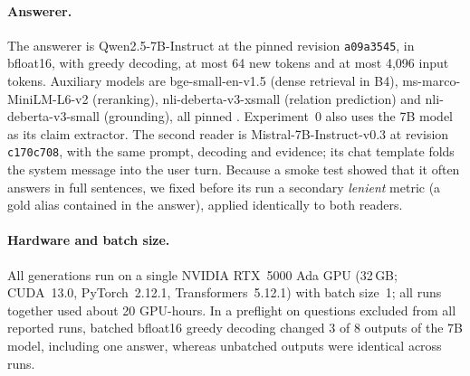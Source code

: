 \paragraph{Answerer.}
The answerer is Qwen2.5-7B-Instruct \citep{qwen2024qwen25} at the pinned revision \texttt{a09a3545}, in bfloat16, with greedy decoding, at most 64 new tokens and at most 4{,}096 input tokens. Auxiliary models are bge-small-en-v1.5 (dense retrieval in B4), ms-marco-MiniLM-L6-v2 (reranking), nli-deberta-v3-xsmall (relation prediction) and nli-deberta-v3-small (grounding), all pinned \citep{he2023debertav3}. Experiment~0 also uses the 7B model as its claim extractor. The second reader is Mistral-7B-Instruct-v0.3 \citep{jiang2023mistral} at revision \texttt{c170c708}, with the same prompt, decoding and evidence; its chat template folds the system message into the user turn. Because a smoke test showed that it often answers in full sentences, we fixed before its run a secondary \emph{lenient} metric (a gold alias contained in the answer), applied identically to both readers.

\paragraph{Hardware and batch size.}
All generations run on a single NVIDIA RTX~5000 Ada GPU (32\,GB; CUDA~13.0, PyTorch~2.12.1, Transformers~5.12.1) with batch size~1; all runs together used about 20 GPU-hours. In a preflight on questions excluded from all reported runs, batched bfloat16 greedy decoding changed 3 of 8 outputs of the 7B model, including one answer, whereas unbatched outputs were identical across runs.

